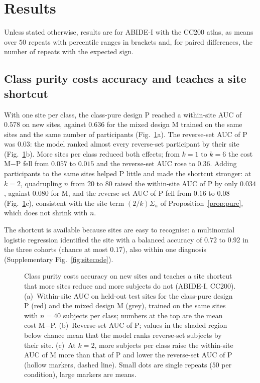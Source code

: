 \section{Results}\label{sec:results}

Unless stated otherwise, results are for ABIDE-I with the CC200 atlas, as means over $50$ repeats with percentile ranges in brackets and, for paired differences, the number of repeats with the expected sign.

\subsection{Class purity costs accuracy and teaches a site shortcut}\label{sec:res-problem}

With one site per class, the class-pure design P reached a within-site AUC of $0.578$ on new sites, against $0.636$ for the mixed design M trained on the same sites and the same number of participants (Fig.~\ref{fig:problem}a). The reverse-set AUC of P was $0.03$: the model ranked almost every reverse-set participant by their site (Fig.~\ref{fig:problem}b). More sites per class reduced both effects; from $k=1$ to $k=6$ the cost M$-$P fell from $0.057$ to $0.015$ and the reverse-set AUC rose to $0.36$. Adding participants to the same sites helped P little and made the shortcut stronger: at $k=2$, quadrupling $n$ from $20$ to $80$ raised the within-site AUC of P by only $0.034$, against $0.080$ for M, and the reverse-set AUC of P fell from $0.16$ to $0.08$ (Fig.~\ref{fig:problem}c), consistent with the site term $(2/k)\Sigma_u$ of Proposition~\ref{prop:pure}, which does not shrink with $n$.

The shortcut is available because sites are easy to recognise: a multinomial logistic regression identified the site with a balanced accuracy of $0.72$ to $0.92$ in the three cohorts (chance at most $0.17$), also within one diagnosis (Supplementary Fig.~\ref{fig:sitecode}).

\begin{figure}[tbp]
\centering
{}
\caption{Class purity costs accuracy on new sites and teaches a site shortcut that more sites reduce and more subjects do not (ABIDE-I, CC200). (a)~Within-site AUC on held-out test sites for the class-pure design P (red) and the mixed design M (grey), trained on the same sites with $n=40$ subjects per class; numbers at the top are the mean cost M$-$P. (b)~Reverse-set AUC of P; values in the shaded region below chance mean that the model ranks reverse-set subjects by their site. (c)~At $k=2$, more subjects per class raise the within-site AUC of M more than that of P and lower the reverse-set AUC of P (hollow markers, dashed line). Small dots are single repeats ($50$ per condition), large markers are means.}
\label{fig:problem}
\end{figure}


